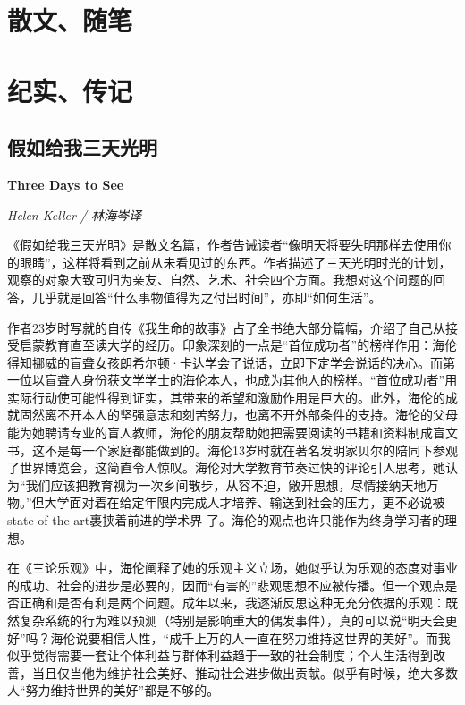 \section{散文、随笔}

\section{纪实、传记}

\subsection*{假如给我三天光明}
\par \textbf{Three Days to See}
\par \emph{Helen Keller / 林海岑译} 
\par 《假如给我三天光明》是散文名篇，作者告诫读者“像明天将要失明那样去使用你的眼睛”，这样将看到之前从未看见过的东西。作者描述了三天光明时光的计划，观察的对象大致可归为亲友、自然、艺术、社会四个方面。我想对这个问题的回答，几乎就是回答“什么事物值得为之付出时间”，亦即“如何生活”。
\par 作者23岁时写就的自传《我生命的故事》占了全书绝大部分篇幅，介绍了自己从接受启蒙教育直至读大学的经历。印象深刻的一点是“首位成功者”的榜样作用：海伦得知挪威的盲聋女孩朗希尔顿·卡达学会了说话，立即下定学会说话的决心。而第一位以盲聋人身份获文学学士的海伦本人，也成为其他人的榜样。“首位成功者”用实际行动使可能性得到证实，其带来的希望和激励作用是巨大的。此外，海伦的成就固然离不开本人的坚强意志和刻苦努力，也离不开外部条件的支持。海伦的父母能为她聘请专业的盲人教师，海伦的朋友帮助她把需要阅读的书籍和资料制成盲文书，这不是每一个家庭都能做到的。海伦13岁时就在著名发明家贝尔的陪同下参观了世界博览会，这简直令人惊叹。海伦对大学教育节奏过快的评论引人思考，她认为“我们应该把教育视为一次乡间散步，从容不迫，敞开思想，尽情接纳天地万物。”但大学面对着在给定年限内完成人才培养、输送到社会的压力，更不必说被state-of-the-art裹挟着前进的学术界
了。海伦的观点也许只能作为终身学习者的理想。
\par 在《三论乐观》中，海伦阐释了她的乐观主义立场，她似乎认为乐观的态度对事业的成功、社会的进步是必要的，因而“有害的”悲观思想不应被传播。但一个观点是否正确和是否有利是两个问题。成年以来，我逐渐反思这种无充分依据的乐观：既然复杂系统的行为难以预测（特别是影响重大的偶发事件），真的可以说“明天会更好”吗？海伦说要相信人性，“成千上万的人一直在努力维持这世界的美好”。而我似乎觉得需要一套让个体利益与群体利益趋于一致的社会制度；个人生活得到改善，当且仅当他为维护社会美好、推动社会进步做出贡献。似乎有时候，绝大多数人“努力维持世界的美好”都是不够的。
\par {}

